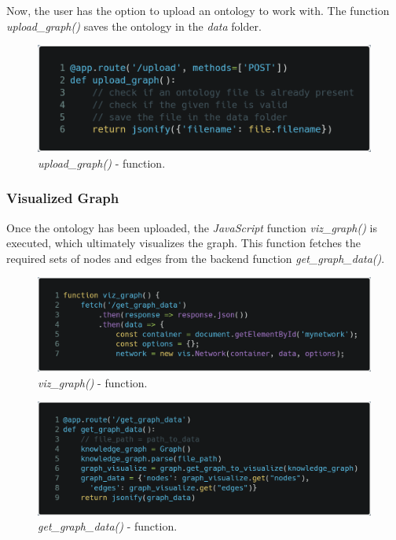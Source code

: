 Now, the user has the option to upload an ontology to work with. The function \textit{upload\_graph()} saves the ontology in the \textit{data} folder.

\begin{figure}[H]
    \includegraphics[scale=0.2]{Graphics/upload_graph.png}
    \caption{\textit{upload\_graph()} - function.}
\end{figure}

\subsubsection*{Visualized Graph}
Once the ontology has been uploaded, the \textit{JavaScript} function \textit{viz\_graph()} is executed, 
which ultimately visualizes the graph. This function fetches the required sets of nodes and edges from the backend function \textit{get\_graph\_data()}.

\begin{figure}[H]
    \includegraphics[scale=0.2]{Graphics/viz_graph_function().png}
    \caption{\textit{viz\_graph()} - function.}

\end{figure}

\begin{figure}[H]
    \includegraphics[scale=0.2]{Graphics/get_graph_data.png}
    \caption{\textit{get\_graph\_data()} - function.}

\end{figure}

